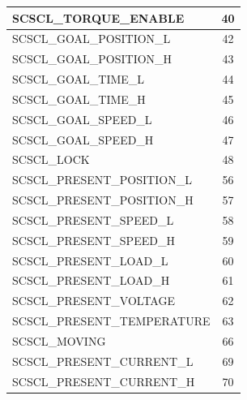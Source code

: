 \begin{center}
\begin{longtable}[c]{|l|c|}
        SCSCL\_TORQUE\_ENABLE & 40 \\
        \hline
        SCSCL\_GOAL\_POSITION\_L & 42 \\
        \hline
        SCSCL\_GOAL\_POSITION\_H & 43 \\
        \hline
        SCSCL\_GOAL\_TIME\_L & 44 \\
        \hline
        SCSCL\_GOAL\_TIME\_H & 45 \\
        \hline
        SCSCL\_GOAL\_SPEED\_L & 46 \\
        \hline
        SCSCL\_GOAL\_SPEED\_H & 47 \\
        \hline
        SCSCL\_LOCK & 48 \\
        \hline
        SCSCL\_PRESENT\_POSITION\_L & 56 \\
        \hline
        SCSCL\_PRESENT\_POSITION\_H & 57 \\
        \hline
        SCSCL\_PRESENT\_SPEED\_L & 58 \\
        \hline
        SCSCL\_PRESENT\_SPEED\_H & 59 \\
        \hline
        SCSCL\_PRESENT\_LOAD\_L & 60 \\
        \hline
        SCSCL\_PRESENT\_LOAD\_H & 61 \\
        \hline
        SCSCL\_PRESENT\_VOLTAGE & 62 \\
        \hline
        SCSCL\_PRESENT\_TEMPERATURE & 63 \\
        \hline
        SCSCL\_MOVING & 66 \\
        \hline
        SCSCL\_PRESENT\_CURRENT\_L & 69 \\
        \hline
        SCSCL\_PRESENT\_CURRENT\_H & 70 \\
        \hline
    \end{longtable}
    
\end{center}
    
